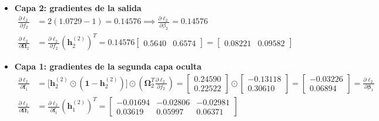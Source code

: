 \documentclass[10pt,a4paper]{article}
\begin{document}
\begin{itemize}
    \item \textbf{Capa 2: gradientes de la salida}
    \begin{align*}
    \frac{\partial \ell_2}{\partial f_2} &= 2(1.0729 - 1) = 0.14576 \implies \frac{\partial \ell_2}{\partial \beta_2} = \mathbf{0.14576} \\[0.1cm]
    \frac{\partial \ell_2}{\partial \boldsymbol{\Omega}_2} &= \frac{\partial \ell_2}{\partial f_2} (\mathbf{h}_2^{(2)})^T = 0.14576 \begin{bmatrix} 0.5640 & 0.6574 \end{bmatrix} = \mathbf{\begin{bmatrix} 0.08221 & 0.09582 \end{bmatrix}}
    \end{align*}

    \item \textbf{Capa 1: gradientes de la segunda capa oculta}
    \begin{align*}
    \frac{\partial \ell_2}{\partial \mathbf{f}_1} &= \big[\mathbf{h}_2^{(2)} \odot (\mathbf{1} - \mathbf{h}_2^{(2)})\big] \odot \left(\boldsymbol{\Omega}_2^T \frac{\partial \ell_2}{\partial f_2}\right) = \begin{bmatrix} 0.24590 \\ 0.22522 \end{bmatrix} \odot \begin{bmatrix} -0.13118 \\ 0.30610 \end{bmatrix} = \mathbf{\begin{bmatrix} -0.03226 \\ 0.06894 \end{bmatrix}} = \frac{\partial \ell_2}{\partial \boldsymbol{\beta}_1} \\[0.1cm]
    \frac{\partial \ell_2}{\partial \boldsymbol{\Omega}_1} &= \frac{\partial \ell_2}{\partial \mathbf{f}_1} (\mathbf{h}_1^{(2)})^T = \mathbf{\begin{bmatrix} -0.01694 & -0.02806 & -0.02981 \\ 0.03619 & 0.05997 & 0.06371 \end{bmatrix}}
    \end{align*}


\end{itemize}
\end{document}
